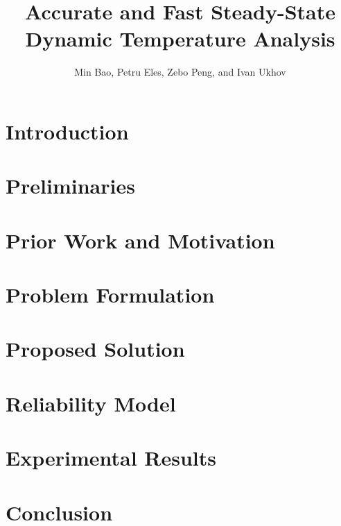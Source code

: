 \documentclass[conference]{IEEEtran}
\title{Accurate and Fast Steady-State\\Dynamic Temperature Analysis}
\author{Min Bao, Petru Eles, Zebo Peng, and Ivan Ukhov}
\begin{document}
  \maketitle

  \begin{abstract}
    
  \end{abstract}

  \section{Introduction}
  

  \section{Preliminaries} \label{sec:preliminaries}
  

  \section{Prior Work and Motivation} \label{sec:motivation}
  

  \section{Problem Formulation} \label{sec:problem}
  

  \section{Proposed Solution} \label{sec:solution}
  

  \section{Reliability Model} \label{sec:reliability}
  

  \section{Experimental Results} \label{sec:results}
  

  \section{Conclusion} \label{sec:conclusion}
  

  
\end{document}

